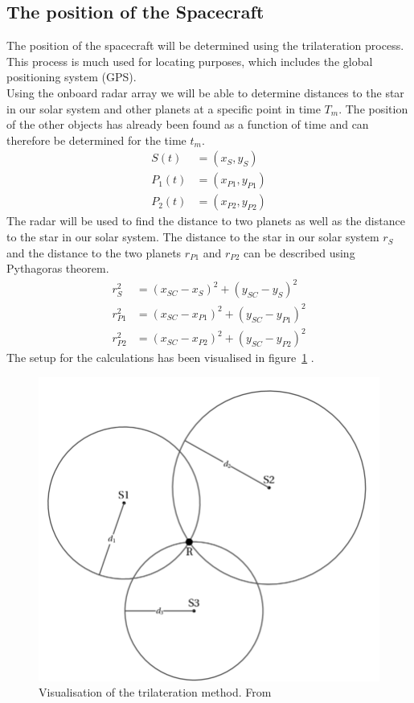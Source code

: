 \documentclass[reprint,english,notitlepage]{revtex4-2}
\begin{document}
\subsection{The position of the Spacecraft}\label{subsec:the-position-of-the-spacecraft}
The position of the spacecraft will be determined using the trilateration process.
This process is much used for locating purposes, which includes the global positioning system (GPS).\\
Using the onboard radar array we will be able to determine distances to the star in our solar system and other planets at a specific point in time $T_m$.
The position of the other objects has already been found as a function of time and can therefore be determined for the time $t_m$.\\
\begin{align*}
    S\left(t \right) &= \left(x_S, y_S \right)\\
	P_1\left(t \right) &= \left(x_{P1}, y_{P1} \right)\\
	P_2\left(t \right) &= \left(x_{P2}, y_{P2} \right)
\end{align*}
The radar will be used to find the distance to two planets as well as the distance to the star in our solar system.
The distance to the star in our solar system $r_S$ and the distance to the two planets $r_{P1}$ and $r_{P2}$ can be described using Pythagoras theorem.
\begin{align}
    r_S^2 &= (x_{SC} - x_S)^2 + (y_{SC} - y_S)^2 \label{r_s}\\
	r_{P1}^2 &= (x_{SC} - x_{P1})^2 + (y_{SC} - y_{P1})^2 \label{r_p1}\\
	r_{P2}^2 &= (x_{SC} - x_{P2})^2 + (y_{SC} - y_{P2})^2  \label{r_p2}
\end{align}
The setup for the calculations has been visualised in figure~\ref{fig:trilateration_figure} .
\begin{figure}[h]
	\centering
	\includegraphics[scale=0.2]{Figures/trilateration}
	\caption{Visualisation of the trilateration method. From%
	}
	\label{fig:trilateration_figure}
\end{figure}
\end{document}
